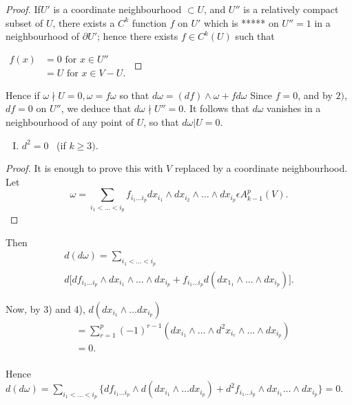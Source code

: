 \begin{proof}
  If\pageoriginale $U'$ is a coordinate neighbourhood $\subset U$, and $U''$ is a
  relatively compact subset of $U$, there exists a $C^k$ function $f$
  on $U'$ which is ***** on $U'' = 1$ in a neighbourhood of $\partial
  U'$; hence there exists $f \in C^k (U)$ such that  
  
  $\begin{aligned}
    f (x) &= 0 \text{ for } x \in U''\\
    &= U \text{ for } x \in V -U.
  \end{aligned}$
\end{proof}

Hence if $\omega \nmid U = 0, \omega = f \omega$ so that $d \omega =
(df) \wedge \omega + f d \omega$ Since $f = 0$, and by $2)$, $df = 0$
on $U''$, we deduce that $d \omega \nmid U'' = 0$. It follows that $d
\omega$ vanishes in a neighbourhood of any point of $U$, so that $d
\omega | U = 0$. 

\begin{enumerate}[II.]
\item \textit{$d^2 = 0$}~ (if $k \geq 3)$. 
\end{enumerate}

\begin{proof}
  It is enough to prove this with $V$ replaced by a coordinate
  neighbourhood. Let 
  $$
  \omega= \sum_{i_1< \dots < i_p} f_{i_{1}\ldots i_p} dx_{i_{1}}
  \wedge dx_{i_{2}} \wedge \ldots \wedge dx_{i_{p}} \epsilon
  A^p_{k-1} (V). 
  $$
\end{proof}

Then
\begin{multline*}
  d(d \omega ) =  \sum\limits_{i_1< \dots < i_p}\\ 
  d  \big [ df_{i_{1}
  \ldots i_p} \wedge dx_{i_{1}} \wedge \ldots \wedge dx_{i_{p}} +
  f_{i_{1} \ldots i_p} d (dx_{1_{1}} \wedge \ldots \wedge dx_{i_{p}})
  \big]. 
\end{multline*}

Now, by 3) and 4),   $d (dx_{i_{1}}\wedge \ldots d x_{i_p})$
\begin{align*}
  &= \sum^{p}_{r=1} (-1)^{r-1} (dx_{i_{1}} \wedge \ldots \wedge
  d^2 x_{i_r} \wedge \dots \wedge dx_{i_{p}}) \\ 
  &= 0. \\
\end{align*}

Hence $d (d \omega) =  \sum\limits_{i_1< \dots < i_p} \big\{
df_{i_{1}\ldots i_p} \wedge d (dx_{i_{1}} \wedge \ldots dx_{i_{p}}) +
d^2 f_{i_{1}\dots i_p} \wedge dx_{i_{1}} \ldots \wedge dx_{i_{p}} \big
\} =0$. 

